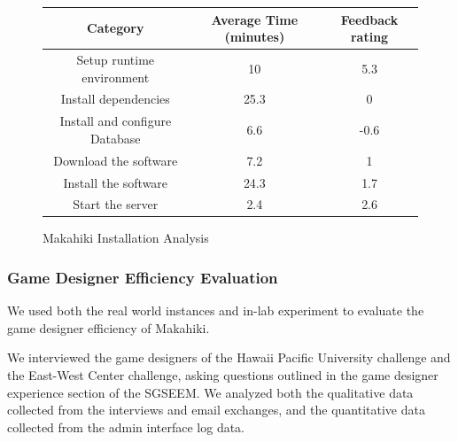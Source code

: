 \documentclass{sigchi}
\newcommand\tabhead[1]{\small\textbf{#1}}
\begin{document}
\begin{figure}[ht!]
  \centering
  \begin{tabular}{|c|c|c|}
    \hline
    \multicolumn{1}{|p{0.5\columnwidth}|}{\centering\tabhead{Category}} &
    \multicolumn{1}{|p{0.2\columnwidth}|}{\centering\tabhead{Average Time (minutes)}} &
    \multicolumn{1}{|p{0.2\columnwidth}|}{\centering\tabhead{Feedback rating}} \\
    \hline
    \multicolumn{1}{|p{0.5\columnwidth}|}{Setup runtime environment} &
    \multicolumn{1}{|p{0.2\columnwidth}|}{10} &
    \multicolumn{1}{|p{0.2\columnwidth}|}{5.3} \\
    \hline
    \multicolumn{1}{|p{0.5\columnwidth}|}{Install dependencies} &
    \multicolumn{1}{|p{0.2\columnwidth}|}{25.3} &
    \multicolumn{1}{|p{0.2\columnwidth}|}{0} \\
    \hline
    \multicolumn{1}{|p{0.5\columnwidth}|}{Install and configure Database} &
    \multicolumn{1}{|p{0.2\columnwidth}|}{6.6} &
    \multicolumn{1}{|p{0.2\columnwidth}|}{-0.6} \\
    \hline
    \multicolumn{1}{|p{0.5\columnwidth}|}{Download the software} &
    \multicolumn{1}{|p{0.2\columnwidth}|}{7.2} &
    \multicolumn{1}{|p{0.2\columnwidth}|}{1} \\
    \hline
    \multicolumn{1}{|p{0.5\columnwidth}|}{Install the software} &
    \multicolumn{1}{|p{0.2\columnwidth}|}{24.3} &
    \multicolumn{1}{|p{0.2\columnwidth}|}{1.7} \\
    \hline
    \multicolumn{1}{|p{0.5\columnwidth}|}{Start the server} &
    \multicolumn{1}{|p{0.2\columnwidth}|}{2.4} &
    \multicolumn{1}{|p{0.2\columnwidth}|}{2.6} \\
    \hline
  \end{tabular}
  \caption{Makahiki Installation Analysis}
  \label{fig:makahiki-install}
\end{figure}

\subsubsection{Game Designer Efficiency Evaluation}

We used both the real world instances and in-lab experiment to evaluate the game
designer efficiency of Makahiki.

We interviewed the game designers of the Hawaii Pacific University challenge
 and the East-West Center challenge, asking questions outlined in the game designer
 experience section of the SGSEEM. We analyzed both the qualitative data collected from
the interviews and email exchanges, and the
quantitative data collected from the admin interface log data.
\end{document}
